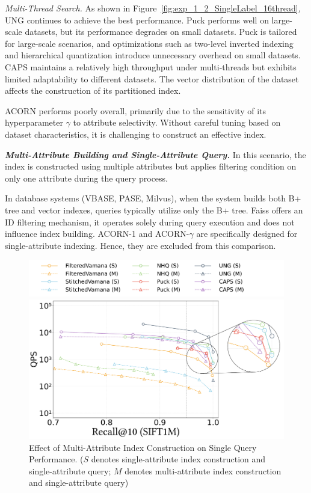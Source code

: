 \documentclass[sigconf, nonacm]{acmart}
\begin{document}
	\textit{Multi-Thread Search.}
	As shown in Figure~\ref{fig:exp_1_2_SingleLabel_16thread}, UNG continues to achieve the best performance. Puck performs well on large-scale datasets, but its performance degrades on small datasets. Puck is tailored for large-scale scenarios, and optimizations such as two-level inverted indexing and hierarchical quantization introduce unnecessary overhead on small datasets. 
	CAPS maintains a relatively high throughput under multi-threads but exhibits limited adaptability to different datasets. The vector distribution of the dataset affects the construction of its partitioned index.
	
	ACORN performs poorly overall, primarily due to the sensitivity of its hyperparameter $\gamma$ to attribute selectivity. Without careful tuning based on dataset characteristics, it is challenging to construct an effective index.
	
	\textit{\textbf{Multi-Attribute Building and Single-Attribute Query.}}
	In this scenario, the index is constructed using multiple attributes but applies filtering condition on only one attribute during the query process.
	
	In database systems (VBASE, PASE, Milvus), when the system builds both B+ tree and vector indexes, queries typically utilize only the B+ tree. Faiss offers an ID filtering mechanism, it operates solely during query execution and does not influence index building. ACORN-1 and ACORN-\(\gamma\) are specifically designed for single-attribute indexing. Hence, they are excluded from this comparison.
	
	\begin{figure}[th]
		\centering
		\setlength{\abovecaptionskip}{0.1cm}
		\setlength{\belowcaptionskip}{-0.1cm}
		\hspace*{15pt} %
		\includegraphics[width=0.98\columnwidth]{figures/exp/exp_2_legend.pdf} %
		
		
		\includegraphics[width=0.8\columnwidth]{figures/exp/exp_2_1.pdf}
		\caption{Effect of Multi-Attribute Index Construction on Single Query Performance. ($S$ denotes single-attribute index construction and single-attribute query; $M$ denotes multi-attribute index construction and single-attribute query)}
		\label{fig:exp_2_1}
		
	\end{figure}
	
\end{document}
